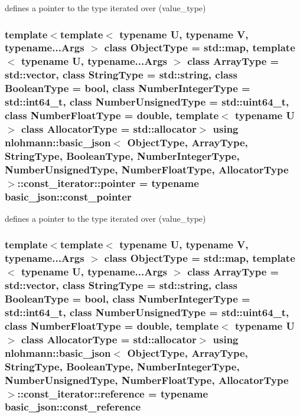 defines a pointer to the type iterated over (value\-\_\-type) 

\hypertarget{classnlohmann_1_1basic__json_1_1const__iterator_a1da96fc3054d547e7706d3a2f073f389}{
\subsubsection[{pointer}]{\setlength{\rightskip}{0pt plus 5cm}template$<$template$<$ typename U, typename V, typename...\-Args $>$ class Object\-Type = std\-::map, template$<$ typename U, typename...\-Args $>$ class Array\-Type = std\-::vector, class String\-Type  = std\-::string, class Boolean\-Type  = bool, class Number\-Integer\-Type  = std\-::int64\-\_\-t, class Number\-Unsigned\-Type  = std\-::uint64\-\_\-t, class Number\-Float\-Type  = double, template$<$ typename U $>$ class Allocator\-Type = std\-::allocator$>$ using {\bf nlohmann\-::basic\-\_\-json}$<$ Object\-Type, Array\-Type, String\-Type, Boolean\-Type, Number\-Integer\-Type, Number\-Unsigned\-Type, Number\-Float\-Type, Allocator\-Type $>$\-::{\bf const\-\_\-iterator\-::pointer} =  typename {\bf basic\-\_\-json\-::const\-\_\-pointer}}}\label{classnlohmann_1_1basic__json_1_1const__iterator_a1da96fc3054d547e7706d3a2f073f389}


defines a pointer to the type iterated over (value\-\_\-type) 

\hypertarget{classnlohmann_1_1basic__json_1_1const__iterator_aefd248cac6493eed1e6ff53ba6a63eb2}{
\subsubsection[{reference}]{\setlength{\rightskip}{0pt plus 5cm}template$<$template$<$ typename U, typename V, typename...\-Args $>$ class Object\-Type = std\-::map, template$<$ typename U, typename...\-Args $>$ class Array\-Type = std\-::vector, class String\-Type  = std\-::string, class Boolean\-Type  = bool, class Number\-Integer\-Type  = std\-::int64\-\_\-t, class Number\-Unsigned\-Type  = std\-::uint64\-\_\-t, class Number\-Float\-Type  = double, template$<$ typename U $>$ class Allocator\-Type = std\-::allocator$>$ using {\bf nlohmann\-::basic\-\_\-json}$<$ Object\-Type, Array\-Type, String\-Type, Boolean\-Type, Number\-Integer\-Type, Number\-Unsigned\-Type, Number\-Float\-Type, Allocator\-Type $>$\-::{\bf const\-\_\-iterator\-::reference} =  typename {\bf basic\-\_\-json\-::const\-\_\-reference}}}\label{classnlohmann_1_1basic__json_1_1const__iterator_aefd248cac6493eed1e6ff53ba6a63eb2}


